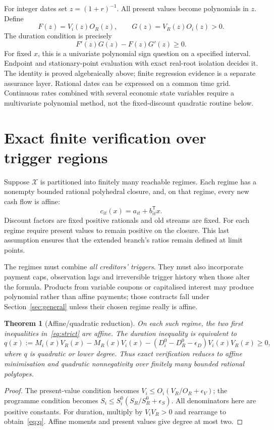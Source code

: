 \documentclass[11pt,a4paper]{article}
\newtheorem{theorem}{Theorem}[section]
\begin{document}
For integer dates set $z=(1+r)^{-1}$. All present values become polynomials in $z$. Define
\begin{equation}
 F(z)=V_i(z)O_R(z),\qquad G(z)=V_R(z)O_i(z)>0.
\end{equation}
The duration condition is precisely
\begin{equation}\label{eq:ratepoly}
 F'(z)G(z)-F(z)G'(z)\geq0.
\end{equation}
For fixed $x$, this is a univariate polynomial sign question on a specified interval. Endpoint and stationary-point evaluation with exact real-root isolation decides it. The identity is proved algebraically above; finite regression evidence is a separate assurance layer. Rational dates can be expressed on a common time grid. Continuous rates combined with several economic state variables require a multivariate polynomial method, not the fixed-discount quadratic routine below.

\section{Exact finite verification over trigger regions}\label{sec:finite}
Suppose $\mathcal X$ is partitioned into finitely many reachable regimes. Each regime has a nonempty bounded rational polyhedral closure, and, on that regime, every new cash flow is affine:
\begin{equation}
 c_{it}(x)=a_{it}+b_{it}^{\mathsf T}x.
\end{equation}
Discount factors are fixed positive rationals and old streams are fixed. For each regime require present values to remain positive on the closure. This last assumption ensures that the extended branch's ratios remain defined at limit points.

The regimes must combine \emph{all creditors' triggers}. They must also incorporate payment caps, observation lags and irreversible trigger history when those alter the formula. Products from variable coupons or capitalised interest may produce polynomial rather than affine payments; those contracts fall under Section~\ref{sec:general} unless their chosen regime really is affine.

\begin{theorem}[Affine/quadratic reduction]\label{thm:finite}
On each such regime, the two first inequalities in~\eqref{eq:strict} are affine. The duration inequality is equivalent to
\begin{equation}\label{eq:q}
 q(x):=M_i(x)V_R(x)-M_R(x)V_i(x)
 -(D_i^0-D_R^0-\epsilon_D)V_i(x)V_R(x)\geq0,
\end{equation}
where $q$ is quadratic or lower degree. Thus exact verification reduces to affine minimisation and quadratic nonnegativity over finitely many bounded rational polytopes.
\end{theorem}
\begin{proof}
The present-value condition becomes
$V_i\leq O_i(V_R/O_R+\epsilon_V)$; the programme condition becomes
$S_i\leq S_i^0(S_R/S_R^0+\epsilon_S)$. All denominators here are positive constants. For duration, multiply by $V_iV_R>0$ and rearrange to obtain~\eqref{eq:q}. Affine moments and present values give degree at most two.
\end{proof}
\end{document}
